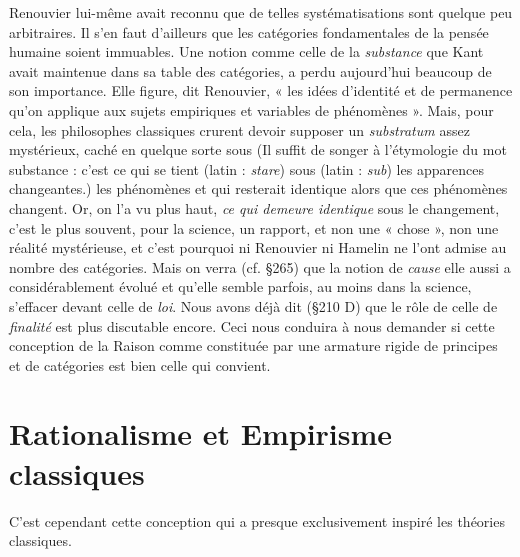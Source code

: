 Renouvier lui-même avait reconnu que de telles systématisations
sont quelque peu arbitraires. Il s’en faut d’ailleurs que les catégories
fondamentales de la pensée humaine soient immuables. Une notion
comme celle de la {\it substance} que Kant avait maintenue dans sa table
des catégories, a perdu aujourd’hui beaucoup de son importance.
Elle figure, dit Renouvier, « les idées d'identité et de permanence
qu’on applique aux sujets empiriques et variables de phénomènes ».
Mais, pour cela, les philosophes classiques crurent devoir supposer
un {\it substratum} assez mystérieux, caché en quelque sorte sous {\scriptsize (Il suffit de songer à l’étymologie du mot {\it }substance : c'est ce qui se tient (latin :
{\it stare}) sous (latin : {\it sub}) les apparences changeantes.)} les
phénomènes et qui resterait identique alors que ces phénomènes
changent. Or, on l’a vu plus haut, {\it ce qui demeure identique} sous le
changement, c’est le plus souvent, pour la science, un rapport, et non
une « chose », non une réalité mystérieuse, et c’est pourquoi ni Renouvier ni Hamelin ne l’ont admise au nombre des catégories. Mais on
verra (cf. \S 265) que la notion de {\it cause} elle aussi a considérablement
évolué et qu’elle semble parfois, au moins dans la science, s’effacer
devant celle de {\it loi}. Nous avons déjà dit (\S 210 D) que le rôle de celle
de {\it finalité} est plus discutable encore. Ceci nous conduira à nous
demander si cette conception de la Raison comme constituée par une
armature rigide de principes et de catégories est bien celle qui
convient.

\section{Rationalisme et Empirisme classiques}%
C’est cependant
cette conception qui a presque exclusivement inspiré les théories
classiques.

